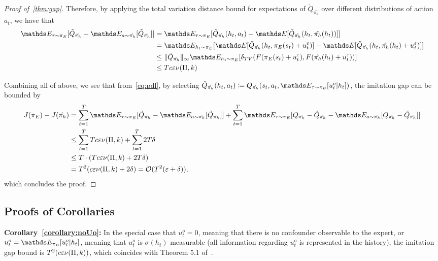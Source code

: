 \begin{proof}[Proof of~\cref{thm:gap}]
Therefore, by applying the total variation distance bound for expectations of $\tilde{Q}_{\hat{\pi_h}}$ over different distributions of action $a_t$, we have that
\begin{align}
\expectE_{\tau\sim \pi_E}[\tilde{Q}_{\hat{\pi_h}}-\expectE_{a\sim\hat{\pi_h}}[\tilde{Q}_{\hat{\pi_h}}]]&=\expectE_{\tau\sim \pi_E}[\tilde{Q}_{\hat{\pi_h}}(h_t,a_t)-\expectE[\tilde{Q}_{\hat{\pi_h}}(h_t,\hat{\pi_h}(h_t))]]\\
&=\expectE_{h_t\sim \pi_E}[\expectE[\tilde{Q}_{\hat{\pi_h}}(h_t,\pi_E(s_t)+u^\epsilon_t)]-\expectE[\tilde{Q}_{\hat{\pi_h}}(h_t,\hat{\pi_h}(h_t)+u^\epsilon_t)]]\\
&\leq \norm{\tilde{Q}_{\hat{\pi_h}}}_\infty \expectE_{h_t\sim \pi_E}[\delta_{TV}(F(\pi_E(s_t)+u^\epsilon_t),F(\hat{\pi_h}(h_t)+u^\epsilon_t))]\\
&\leq T c\epsilon\ill(\Pi,k) 
\end{align}

Combining all of above, we see that from~\cref{eq:pdl}, by selecting $\tilde{Q}_{\hat{\pi_h}}(h_t,a_t)\coloneqq Q_{\hat{\pi_h}}(s_t,a_t,\expectE_{\tau\sim \pi_E}[u^o_t\lvert h_t])$, the imitation gap can be bounded by
\begin{align}
   J(\pi_E)-J(\hat{\pi_h})&=\sum_{t=1}^T \expectE_{\tau\sim\pi_E}[\tilde{Q}_{\hat{\pi_h}}-\expectE_{a\sim\hat{\pi_h}}[\tilde{Q}_{\hat{\pi_h}}]]+\sum_{t=1}^T \expectE_{\tau\sim\pi_E}[Q_{\hat{\pi_h}}-\tilde{Q}_{\hat{\pi_h}}-\expectE_{a\sim\hat{\pi_h}}[Q_{\hat{\pi_h}}-\tilde{Q}_{\hat{\pi_h}}]]\\
    &\leq\sum_{t=1}^T Tc\epsilon\ill(\Pi,k) +\sum_{t=1}^T 2T\delta\\
    &\leq T\cdot (Tc\epsilon\ill(\Pi,k) + 2T\delta)\\
   &= T^2(c\epsilon\ill(\Pi,k)+2\delta)=\mathcal{O}(T^2(\epsilon+\delta)),
\end{align}
which concludes the proof.
\end{proof}

\subsection{Proofs of Corollaries}\label{appendix:corollaries}

\textbf{Corollary~\ref{corollary:noUo}:} In the special case that $u^o_t = 0$, meaning that there is no confounder observable to the expert, or $u^o_t=\expectE_{\pi_E}[u^o_t\lvert h_t]$, meaning that $u^o_t$ is $\sigma(h_t)$ measurable (all information regarding $u^o_t$ is represented in the history), the imitation gap bound is $T^2(c\varepsilon\nu(\Pi,k))$, which coincides with Theorem 5.1 of~\citet{Swamy2022_temporal}.

